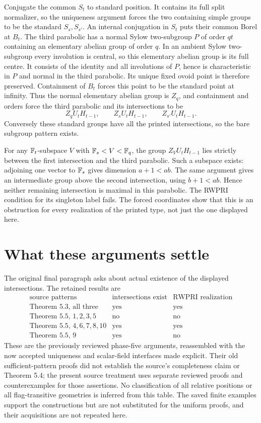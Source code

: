 \documentclass[11pt,a4paper]{article}
\begin{document}
Conjugate the common $S_t$ to standard position. It contains its
full split normalizer, so the uniqueness argument forces the two
containing simple groups to be the standard $S_s,S_{s'}$.
An internal conjugation in $S_t$ puts their common Borel at $B_t$.
The third parabolic has a normal Sylow two-subgroup $P$ of order $qt$
containing an elementary abelian group of order $q$. In an ambient
Sylow two-subgroup every involution is central, so this elementary
abelian group is its full centre. It consists of the identity and all
involutions of $P$, hence is characteristic in $P$ and normal in the
third parabolic. Its unique fixed ovoid point is therefore preserved.
Containment of $B_t$ forces this point to be the standard point at
infinity. Thus the normal elementary abelian group is $Z_q$, and
containment and orders force the third parabolic and its intersections
to be
\[
 Z_qU_tH_{t-1},\qquad Z_sU_tH_{t-1},\qquad
 Z_{s'}U_tH_{t-1}.
\]
Conversely these standard groups have all the printed intersections,
so the bare subgroup pattern exists.

For any $\mathbb F_t$-subspace $V$ with $\mathbb F_s<V<\mathbb F_q$, the group
$Z_VU_tH_{t-1}$ lies strictly between the first intersection and the
third parabolic. Such a subspace exists: adjoining one vector to
$\mathbb F_s$ gives dimension $a+1<ab$. The same argument gives an
intermediate group above the second intersection, using $b+1<ab$.
Hence neither remaining intersection is maximal in this parabolic.
The RWPRI condition for its singleton label fails. The forced
coordinates show that this is an obstruction for every realization
of the printed type, not just the one displayed here.

\section{What these arguments settle}
The original final paragraph asks about actual existence of the
displayed intersections. The retained results are
\[
\begin{array}{l|c|c}
\text{source patterns}&\text{intersections exist}&\text{RWPRI realization}\\\hline
\text{Theorem 5.3, all three}&\text{yes}&\text{yes}\\
\text{Theorem 5.5, }1,2,3,5&\text{no}&\text{no}\\
\text{Theorem 5.5, }4,6,7,8,10&\text{yes}&\text{yes}\\
\text{Theorem 5.5, }9&\text{yes}&\text{no}
\end{array}
\]
These are the previously reviewed phase-five arguments, reassembled
with the now accepted uniqueness and scalar-field interfaces made
explicit. Their old sufficient-pattern proofs did not establish the
source's completeness claim or Theorem 5.4; the present source treatment
uses separate reviewed proofs and counterexamples for those assertions.
No classification of all relative positions or all flag-transitive
geometries is inferred from this table. The saved finite examples
support the constructions but are not substituted for the uniform
proofs, and their acquisitions are not repeated here.
\end{document}
